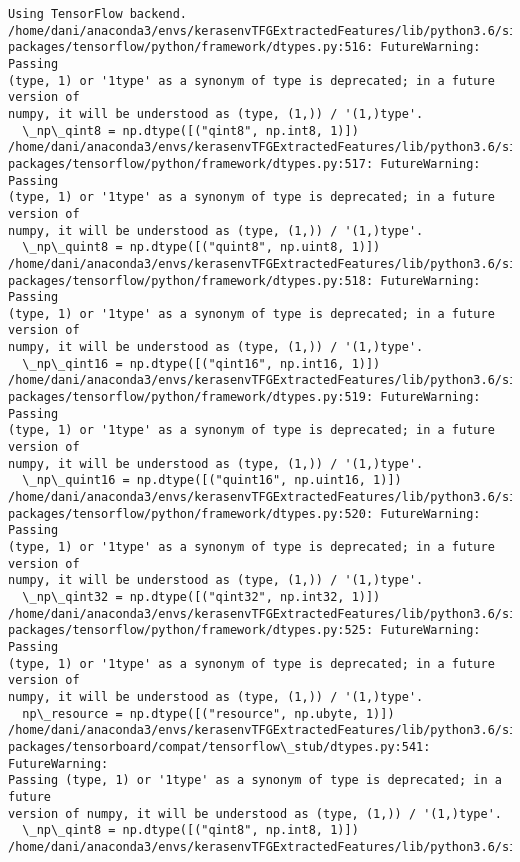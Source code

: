 \documentclass[11pt]{article}
\begin{document}
    \begin{Verbatim}[commandchars=\\\{\}]
Using TensorFlow backend.
/home/dani/anaconda3/envs/kerasenvTFGExtractedFeatures/lib/python3.6/site-
packages/tensorflow/python/framework/dtypes.py:516: FutureWarning: Passing
(type, 1) or '1type' as a synonym of type is deprecated; in a future version of
numpy, it will be understood as (type, (1,)) / '(1,)type'.
  \_np\_qint8 = np.dtype([("qint8", np.int8, 1)])
/home/dani/anaconda3/envs/kerasenvTFGExtractedFeatures/lib/python3.6/site-
packages/tensorflow/python/framework/dtypes.py:517: FutureWarning: Passing
(type, 1) or '1type' as a synonym of type is deprecated; in a future version of
numpy, it will be understood as (type, (1,)) / '(1,)type'.
  \_np\_quint8 = np.dtype([("quint8", np.uint8, 1)])
/home/dani/anaconda3/envs/kerasenvTFGExtractedFeatures/lib/python3.6/site-
packages/tensorflow/python/framework/dtypes.py:518: FutureWarning: Passing
(type, 1) or '1type' as a synonym of type is deprecated; in a future version of
numpy, it will be understood as (type, (1,)) / '(1,)type'.
  \_np\_qint16 = np.dtype([("qint16", np.int16, 1)])
/home/dani/anaconda3/envs/kerasenvTFGExtractedFeatures/lib/python3.6/site-
packages/tensorflow/python/framework/dtypes.py:519: FutureWarning: Passing
(type, 1) or '1type' as a synonym of type is deprecated; in a future version of
numpy, it will be understood as (type, (1,)) / '(1,)type'.
  \_np\_quint16 = np.dtype([("quint16", np.uint16, 1)])
/home/dani/anaconda3/envs/kerasenvTFGExtractedFeatures/lib/python3.6/site-
packages/tensorflow/python/framework/dtypes.py:520: FutureWarning: Passing
(type, 1) or '1type' as a synonym of type is deprecated; in a future version of
numpy, it will be understood as (type, (1,)) / '(1,)type'.
  \_np\_qint32 = np.dtype([("qint32", np.int32, 1)])
/home/dani/anaconda3/envs/kerasenvTFGExtractedFeatures/lib/python3.6/site-
packages/tensorflow/python/framework/dtypes.py:525: FutureWarning: Passing
(type, 1) or '1type' as a synonym of type is deprecated; in a future version of
numpy, it will be understood as (type, (1,)) / '(1,)type'.
  np\_resource = np.dtype([("resource", np.ubyte, 1)])
/home/dani/anaconda3/envs/kerasenvTFGExtractedFeatures/lib/python3.6/site-
packages/tensorboard/compat/tensorflow\_stub/dtypes.py:541: FutureWarning:
Passing (type, 1) or '1type' as a synonym of type is deprecated; in a future
version of numpy, it will be understood as (type, (1,)) / '(1,)type'.
  \_np\_qint8 = np.dtype([("qint8", np.int8, 1)])
/home/dani/anaconda3/envs/kerasenvTFGExtractedFeatures/lib/python3.6/site-

\end{Verbatim}
\end{document}
